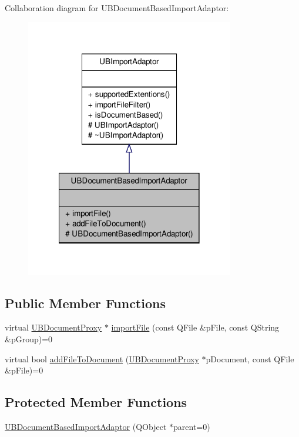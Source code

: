 Collaboration diagram for U\-B\-Document\-Based\-Import\-Adaptor\-:
\nopagebreak
\begin{figure}[H]
\begin{center}
\leavevmode
\includegraphics[width=258pt]{df/ded/class_u_b_document_based_import_adaptor__coll__graph}
\end{center}
\end{figure}
\subsection*{Public Member Functions}
\begin{DoxyCompactItemize}
\item 
virtual \hyperlink{class_u_b_document_proxy}{U\-B\-Document\-Proxy} $\ast$ \hyperlink{class_u_b_document_based_import_adaptor_a00460b6e21115cef98ad19864ba7a345}{import\-File} (const Q\-File \&p\-File, const Q\-String \&p\-Group)=0
\item 
virtual bool \hyperlink{class_u_b_document_based_import_adaptor_af0bf9f9f37f8a79adbf24013368cc362}{add\-File\-To\-Document} (\hyperlink{class_u_b_document_proxy}{U\-B\-Document\-Proxy} $\ast$p\-Document, const Q\-File \&p\-File)=0
\end{DoxyCompactItemize}
\subsection*{Protected Member Functions}
\begin{DoxyCompactItemize}
\item 
\hyperlink{class_u_b_document_based_import_adaptor_a9028569417a472996a935089a83ebc35}{U\-B\-Document\-Based\-Import\-Adaptor} (Q\-Object $\ast$parent=0)
\end{DoxyCompactItemize}


